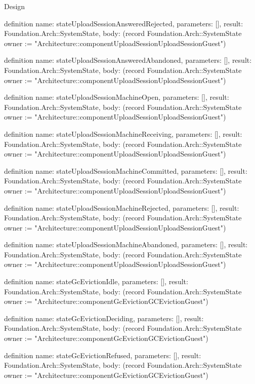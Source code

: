 \begin{lexlean}{Design}
\begin{semanticmodule}
definition{
  name: stateUploadSessionAnsweredRejected,
  parameters: [],
  result: Foundation.Arch::SystemState,
  body: (record Foundation.Arch::SystemState {owner := "Architecture::componentUploadSessionUploadSessionGuest"})
}

definition{
  name: stateUploadSessionAnsweredAbandoned,
  parameters: [],
  result: Foundation.Arch::SystemState,
  body: (record Foundation.Arch::SystemState {owner := "Architecture::componentUploadSessionUploadSessionGuest"})
}

definition{
  name: stateUploadSessionMachineOpen,
  parameters: [],
  result: Foundation.Arch::SystemState,
  body: (record Foundation.Arch::SystemState {owner := "Architecture::componentUploadSessionUploadSessionGuest"})
}

definition{
  name: stateUploadSessionMachineReceiving,
  parameters: [],
  result: Foundation.Arch::SystemState,
  body: (record Foundation.Arch::SystemState {owner := "Architecture::componentUploadSessionUploadSessionGuest"})
}

definition{
  name: stateUploadSessionMachineCommitted,
  parameters: [],
  result: Foundation.Arch::SystemState,
  body: (record Foundation.Arch::SystemState {owner := "Architecture::componentUploadSessionUploadSessionGuest"})
}

definition{
  name: stateUploadSessionMachineRejected,
  parameters: [],
  result: Foundation.Arch::SystemState,
  body: (record Foundation.Arch::SystemState {owner := "Architecture::componentUploadSessionUploadSessionGuest"})
}

definition{
  name: stateUploadSessionMachineAbandoned,
  parameters: [],
  result: Foundation.Arch::SystemState,
  body: (record Foundation.Arch::SystemState {owner := "Architecture::componentUploadSessionUploadSessionGuest"})
}

definition{
  name: stateGcEvictionIdle,
  parameters: [],
  result: Foundation.Arch::SystemState,
  body: (record Foundation.Arch::SystemState {owner := "Architecture::componentGcEvictionGCEvictionGuest"})
}

definition{
  name: stateGcEvictionDeciding,
  parameters: [],
  result: Foundation.Arch::SystemState,
  body: (record Foundation.Arch::SystemState {owner := "Architecture::componentGcEvictionGCEvictionGuest"})
}

definition{
  name: stateGcEvictionRefused,
  parameters: [],
  result: Foundation.Arch::SystemState,
  body: (record Foundation.Arch::SystemState {owner := "Architecture::componentGcEvictionGCEvictionGuest"})
}


\end{semanticmodule}
\end{lexlean}
